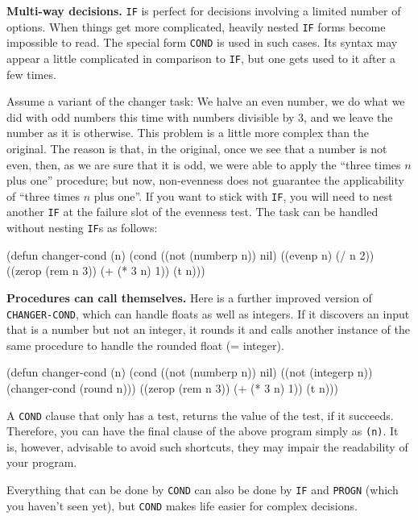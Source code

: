 \documentclass[a4paper,11pt]{article}
\begin{document}
\begin{uenum}
\item {\bf Multi-way decisions.} \Verb+IF+ is perfect for decisions involving a limited number of options. When things get more complicated, heavily nested \Verb+IF+ forms become impossible to read. The special form \Verb+COND+ is used in such cases. Its syntax may appear a little complicated in comparison to \Verb+IF+, but one gets used to it after a few times.

Assume a variant of the changer task: We halve an even number, we do what we did with odd numbers this time with numbers divisible by 3, and we leave the number as it is otherwise. This problem is a little more complex than the original. The reason is that, in the original, once we see that a number is not even, then, as we are sure that it is odd, we were able to apply the ``three times $n$ plus one'' procedure; but now, non-evenness does not guarantee the applicability of ``three times $n$ plus one''. If you want to stick with \Verb+IF+, you will need to nest another \Verb+IF+ at the failure slot of the evenness test. The task can be handled without nesting \Verb+IF+s as follows:

\begin{lispcode}
(defun changer-cond (n)
  (cond ((not (numberp n)) nil)
        ((evenp n) (/ n 2))
        ((zerop (rem n 3)) (+ (* 3 n) 1))
        (t n)))
\end{lispcode}

\item {\bf Procedures can call themselves.} Here is a further improved version of \Verb+CHANGER-COND+, which can handle floats as well as integers. If it discovers an input that is a number but not an integer, it rounds it and calls another instance of the same procedure to handle the rounded float (= integer).  

\begin{lispcode}
(defun changer-cond (n)
  (cond ((not (numberp n)) nil)
        ((not (integerp n)) (changer-cond (round n)))
        ((zerop (rem n 3)) (+ (* 3 n) 1))
        (t n)))
\end{lispcode}

\item A \Verb+COND+ clause that only has a test, returns the value of the test, if it succeeds. Therefore, you can have the final clause of the above program simply as \Verb+(n)+. It is, however, advisable to avoid such shortcuts, they may impair the readability of your program. 

\item Everything that can be done by \Verb+COND+ can also be done by \Verb+IF+ and \Verb+PROGN+ (which you haven't seen yet), but \Verb+COND+ makes life easier for complex decisions.  


\end{uenum}
\end{document}
